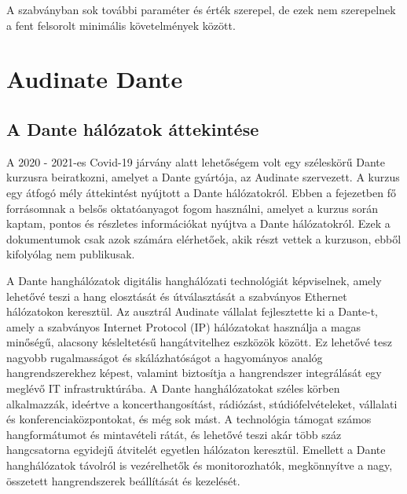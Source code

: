 A szabványban sok további paraméter és érték szerepel, de ezek nem szerepelnek a
fent felsorolt minimális követelmények között.






\section{Audinate Dante}
\subsection{A Dante hálózatok áttekintése}
A 2020 - 2021-es Covid-19 járvány alatt lehetőségem volt egy széleskörű Dante
kurzusra beiratkozni, amelyet a Dante gyártója, az Audinate szervezett. A kurzus
egy átfogó mély áttekintést nyújtott a Dante hálózatokról. Ebben a fejezetben
fő forrásomnak a belsős oktatóanyagot fogom használni, amelyet a kurzus
során kaptam, pontos és részletes információkat nyújtva a Dante hálózatokról.
Ezek a dokumentumok csak azok számára elérhetőek, akik részt vettek a kurzuson, ebből kifolyólag nem publikusak.

A Dante hanghálózatok digitális hanghálózati technológiát képviselnek, amely
lehetővé teszi a hang elosztását és útválasztását a szabványos Ethernet
hálózatokon keresztül. Az ausztrál Audinate vállalat fejlesztette ki a Dante-t,
amely a szabványos Internet Protocol (IP) hálózatokat használja a magas minőségű,
alacsony késleltetésű hangátvitelhez eszközök között. Ez lehetővé tesz
nagyobb rugalmasságot és skálázhatóságot a hagyományos analóg hangrendszerekhez
képest, valamint biztosítja a hangrendszer integrálását egy meglévő IT infrastruktúrába.
A Dante hanghálózatokat széles körben alkalmazzák, ideértve a koncerthangosítást,
rádiózást, stúdiófelvételeket, vállalati és konferenciaközpontokat, és még sok mást.
A technológia támogat számos hangformátumot és mintavételi rátát, és lehetővé
teszi akár több száz hangcsatorna egyidejű átvitelét egyetlen hálózaton keresztül.
Emellett a Dante hanghálózatok távolról is vezérelhetők és monitorozhatók,
megkönnyítve a nagy, összetett hangrendszerek beállítását és kezelését.

